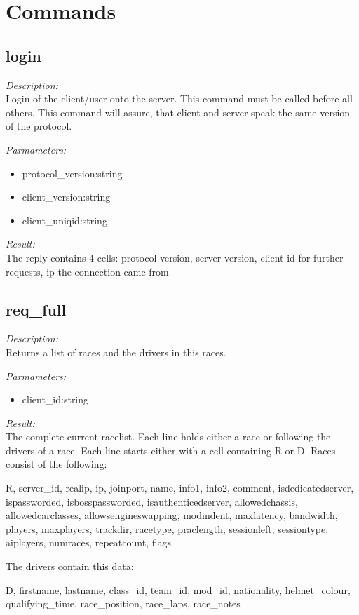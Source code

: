\section{Commands}

\subsection{login}

\begin{description}
\item {\it Description:}\\
Login of the client/user onto the server. This command must be called before all others. This command will assure, that client and server speak the same version of the protocol.
\item {\it Parmameters:}
\begin{itemize}
\item protocol\_version:string
\item client\_version:string
\item client\_uniqid:string
\end{itemize}
\item {\it Result:}\\
The reply contains 4 cells: protocol version, server version, client id for further requests, ip the connection came from
\end{description}

\subsection{req\_full}

\begin{description}
\item {\it Description:}\\
Returns a list of races and the drivers in this races.
\item {\it Parmameters:}
\begin{itemize}
\item client\_id:string
\end{itemize}
\item {\it Result:}\\
The complete current racelist. Each line holds either a race or following the drivers of a race. Each line starts either with a cell containing R or D. Races consist of the following: 
			
		R, 
		server\_id, 
		realip, 
		ip, 
		joinport, 
		name, 
		info1, 
		info2, 
		comment, 
		isdedicatedserver, 
		ispassworded, 
		isbosspassworded, 
		isauthenticedserver, 
		allowedchassis, 
		allowedcarclasses, 
		allowsengineswapping, 
		modindent, 
		maxlatency, 
		bandwidth, 
		players,
		maxplayers, 
		trackdir, 
		racetype, 
		praclength, 
		sessionleft, 
		sessiontype,
		aiplayers,
		numraces,
		repeatcount,
		flags


		The drivers contain this data:

		D,
		firstname,
		lastname,
		class\_id,
		team\_id,
		mod\_id,
		nationality,
		helmet\_colour,
		qualifying\_time,
		race\_position,
		race\_laps,
		race\_notes
		
\end{description}

